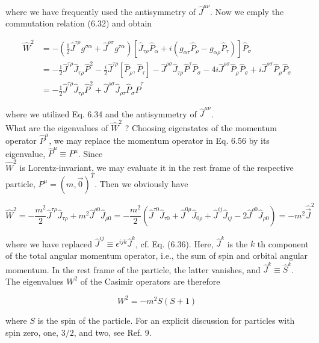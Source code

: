 \documentclass[10pt, letterpaper]{article}
\begin{document}
where we have frequently used the antisymmetry of $\hat{J}^{\mu \nu}$. Now we emply the commutation relation (6.32) and obtain

$$
\begin{aligned}
\hat{W}^{2} & =-\left(\frac{1}{2} \hat{J}^{\tau \rho} g^{\sigma \alpha}+\hat{J}^{\rho \sigma} g^{\tau \alpha}\right)\left[\hat{J}_{\tau \rho} \hat{P}_{\alpha}+i\left(g_{\alpha \tau} \hat{P}_{\rho}-g_{\alpha \rho} \hat{P}_{\tau}\right)\right] \hat{P}_{\sigma} \\
& =-\frac{1}{2} \hat{J}^{\tau \rho} \hat{J}_{\tau \rho} \hat{P}^{2}-\frac{i}{2} \hat{J}^{\tau \rho}\left[\hat{P}_{\rho}, \hat{P}_{\tau}\right]-\hat{J}^{\rho \sigma} \hat{J}_{\tau \rho} \hat{P}^{\tau} \hat{P}_{\sigma}-4 i \hat{J}^{\rho \sigma} \hat{P}_{\rho} \hat{P}_{\sigma}+i \hat{J}^{\rho \sigma} \hat{P}_{\rho} \hat{P}_{\sigma} \\
& =-\frac{1}{2} \hat{J}^{\tau \rho} \hat{J}_{\tau \rho} \hat{P}^{2}+\hat{J}^{\rho \sigma} \hat{J}_{\rho \tau} \hat{P}_{\sigma} \hat{P}^{\tau}
\end{aligned}
$$

where we utilized Eq. 6.34 and the antisymmetry of $\hat{J}^{\mu \nu}$.\\
What are the eigenvalues of $\hat{W}^{2}$ ? Choosing eigenstates of the momentum operator $\hat{P}^{\mu}$, we may replace the momentum operator in Eq. 6.56 by its eigenvalue, $\hat{P}^{\mu} \equiv P^{\mu}$. Since\\
$\hat{W}^{2}$ is Lorentz-invariant, we may evaluate it in the rest frame of the respective particle, $P^{\mu}=(m, \overrightarrow{0})^{T}$. Then we obviously have

$$
\hat{W}^{2}=-\frac{m^{2}}{2} \hat{J}^{\tau \rho} \hat{J}_{\tau \rho}+m^{2} \hat{J}^{\rho 0} \hat{J}_{\rho 0}=-\frac{m^{2}}{2}\left(\hat{J}^{\tau 0} \hat{J}_{\tau 0}+\hat{J}^{0 \rho} \hat{J}_{0 \rho}+\hat{J}^{i j} \hat{J}_{i j}-2 \hat{J}^{\rho 0} \hat{J}_{\rho 0}\right)=-m^{2} \hat{\vec{J}}^{2}
$$

where we have replaced $\hat{J}^{i j} \equiv \epsilon^{i j k} \hat{J}^{k}$, cf. Eq. (6.36). Here, $\hat{J}^{k}$ is the $k$ th component of the total angular momentum operator, i.e., the sum of spin and orbital angular momentum. In the rest frame of the particle, the latter vanishes, and $\hat{J}^{k} \equiv \hat{S}^{k}$. The eigenvalues $W^{2}$ of the Casimir operators are therefore

$$
W^{2}=-m^{2} S(S+1)
$$

where $S$ is the spin of the particle. For an explicit discussion for particles with spin zero, one, $3 / 2$, and two, see Ref. 9.
\end{document}
